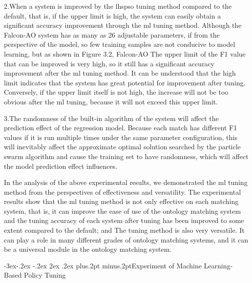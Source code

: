 \documentclass[twoside]{article}
\makeatletter
\def\subsection{\@startsection{subsection}{2}{\z@}%
 {-3ex\@plus -.2ex \@minus -.2ex}%
 {2ex \@plus.2ex}%
{\normalfont\normalsize\protect\baselineskip=12.5pt plus.2pt minus.2pt\bfseries}}
\makeatother
\begin{document}
\begin{multicols}{2}
2.When a system is improved by the lhspso tuning method compared to the default, that is, if the upper limit is high, the system can easily obtain a significant accuracy improvement through the ml tuning method. 
Although the Falcon-AO system has as many as 26 adjustable parameters, if from the perspective of the model, so few training samples are not conducive to model learning, but as shown in Figure 3.2, Falcon-AO The upper limit of the F1 value that can be improved is very high, so it still has a significant accuracy improvement after the ml tuning method. It can be understood that the high limit indicates that the system has great potential for improvement after tuning. 
Conversely, if the upper limit itself is not high, the increase will not be too obvious after the ml tuning, because it will not exceed this upper limit.

3.The randomness of the built-in algorithm of the system will affect the prediction effect of the regression model. 
Because each match has different F1 values if it is run multiple times under the same parameter configuration, this will inevitably affect the approximate optimal solution searched by the particle swarm algorithm and cause the training set to have randomness, which will affect the model prediction effect influences.

In the analysis of the above experimental results, we demonstrated the ml tuning method from the perspectives of effectiveness and versatility. 
The experimental results show that the ml tuning method is not only effective on each matching system, that is, it can improve the ease of use of the ontology matching system and the tuning accuracy of each system after tuning has been improved to some extent compared to the default; and The tuning method is also very versatile. It can play a role in many different grades of ontology matching systems, and it can be a universal module in the ontology matching system.

\subsection{Experiment of Machine Learning-Based Policy Tuning}


\end{multicols}
\end{document}

